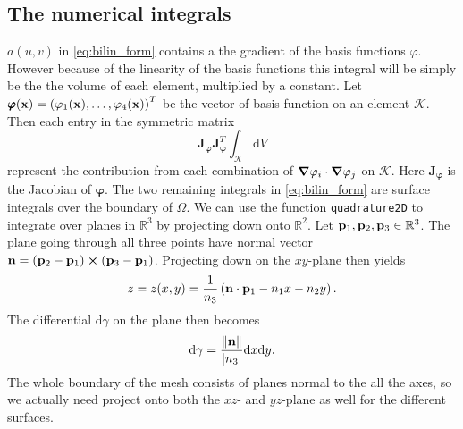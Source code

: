 \subsection{The numerical integrals}
$a(u,v)$ in \eqref{eq:bilin_form} contains a the gradient of the basis functions $\varphi$. However because of the linearity of the basis functions this integral will be simply be the the volume of each element, multiplied by a constant. Let $\pmb{\varphi}(\vb{x}) = \left(\varphi_1(\vb{x}),\dots,\varphi_4(\vb{x})\right)^T$ be the vector of basis function on an element $\mathcal{K}$. Then each entry in the symmetric matrix
\begin{equation}
    \pmb{J}_{\pmb{\varphi}}\pmb{J}_{\pmb{\varphi}}^T\int_\mathcal{K} \! \mathrm{d}V
\end{equation}
represent the contribution from each combination of $\grad{\varphi_i}\cdot\grad{\varphi_j}$ on $\mathcal{K}$. Here $\pmb{J}_{\pmb{\varphi}}$ is the Jacobian of $\pmb{\varphi}$. The two remaining integrals in \eqref{eq:bilin_form} are surface integrals over the boundary of $\Omega$. We can use the function \texttt{quadrature2D} to integrate over planes in $\mathbb{R}^3$ by projecting down onto $\mathbb{R}^2$. Let $\vb{p}_1,\vb{p}_2,\vb{p}_3 \in \mathbb{R}^3$. The plane going through all three points have normal vector $\vb{n} = (\vb{p}_2-\vb{p}_1)\cross (\vb{p}_3-\vb{p}_1)$. Projecting down on the $xy$-plane then yields
\begin{equation}
    z = z(x,y)=\frac{1}{n_3}\left(\vb{n}\cdot \vb{p}_1-n_1x-n_2y\right).
\end{equation}
The differential $\mathrm{d}\gamma$ on the plane then becomes
\begin{equation}
    \mathrm{d}\gamma = \frac{\norm{\vb{n}}}{\abs{n_3}}\mathrm{d}x\mathrm{d}y.
\end{equation}
The whole boundary of the mesh consists of planes normal to the all the axes, so we actually need project onto both the $xz$- and $yz$-plane as well for the different surfaces.